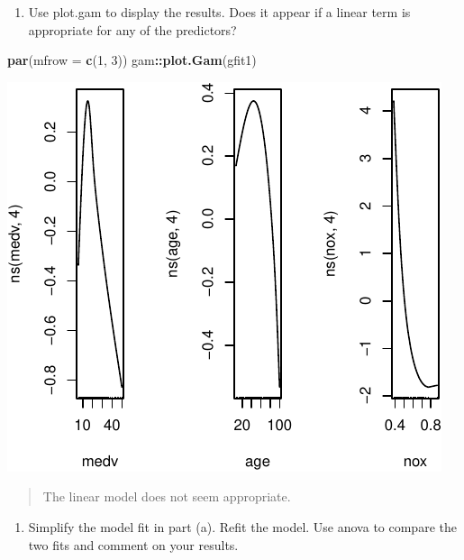 \documentclass[]{article}
\newenvironment{Shaded}{\begin{snugshade}}{\end{snugshade}}
\newcommand{\DataTypeTok}[1]{\textcolor[rgb]{0.13,0.29,0.53}{#1}}
\newcommand{\DecValTok}[1]{\textcolor[rgb]{0.00,0.00,0.81}{#1}}
\newcommand{\KeywordTok}[1]{\textcolor[rgb]{0.13,0.29,0.53}{\textbf{#1}}}
\newcommand{\NormalTok}[1]{#1}
\newcommand{\OperatorTok}[1]{\textcolor[rgb]{0.81,0.36,0.00}{\textbf{#1}}}
\providecommand{\tightlist}{%
  \setlength{\itemsep}{0pt}\setlength{\parskip}{0pt}}
\begin{document}
\begin{enumerate}
\def\labelenumi{(\alph{enumi})}
\setcounter{enumi}{1}
\tightlist
\item
  Use plot.gam to display the results. Does it appear if a linear term
  is appropriate for any of the predictors?
\end{enumerate}

\begin{Shaded}
\begin{Highlighting}[]
\KeywordTok{par}\NormalTok{(}\DataTypeTok{mfrow =} \KeywordTok{c}\NormalTok{(}\DecValTok{1}\NormalTok{, }\DecValTok{3}\NormalTok{))}
\NormalTok{gam}\OperatorTok{::}\KeywordTok{plot.Gam}\NormalTok{(gfit1)}
\end{Highlighting}
\end{Shaded}

\begin{center}\includegraphics{sol_A4_files/figure-latex/unnamed-chunk-8-1} \end{center}

\begin{quote}
The linear model does not seem appropriate.
\end{quote}

\begin{enumerate}
\def\labelenumi{(\alph{enumi})}
\setcounter{enumi}{2}
\tightlist
\item
  Simplify the model fit in part (a). Refit the model. Use anova to
  compare the two fits and comment on your results.
\end{enumerate}
\end{document}
